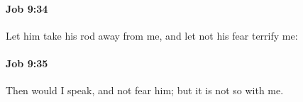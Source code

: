 		\paragraph{Job 9:34} %
			\label{JOB-9-34}

			Let him take his rod away from me, and let not his fear terrify me:


		\paragraph{Job 9:35} %
			\label{JOB-9-35}

			Then would I speak, and not fear him; but it is not so with me.


